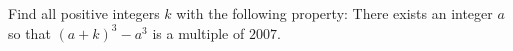 Find all positive integers $ k$ with the following property: There exists an integer $ a$ so that $ (a+k)^{3}-a^{3}$ is a multiple of $ 2007$.